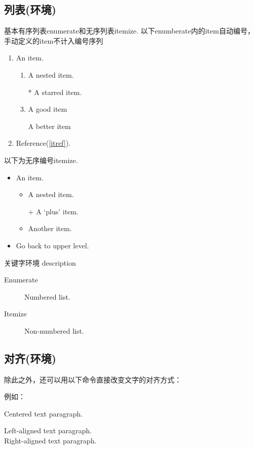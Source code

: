 \documentclass[10pt,a4paper,twocolumn]{book}
\begin{document}
\subsection{列表(环境)}
 基本有序列表enumerate和无序列表itemize.
以下enumberate内的item自动编号，手动定义的item不计入编号序列
 \begin{enumerate}
    \item An item.
    \begin{enumerate}
    \item A nested item.\label{itref} 
    \item[*] A starred item.
    \item A good item
    \item[] A better item
    \end{enumerate} 
    \item Reference(\ref{itref}). 
\end{enumerate}
以下为无序编号itemize.
\begin{itemize}
    \item An item. \begin{itemize}
    \item A nested item. 
    \item[+] A `plus' item. 
    \item Another item.
    \end{itemize} 
    \item Go back to upper level. 
\end{itemize}
关键字环境 description
\begin{description}
    \item[Enumerate] Numbered list. 
    \item[Itemize] Non-numbered list. 
\end{description}
\subsection{对齐(环境)}
除此之外，还可以用以下命令直接改变文字的对齐方式： 

例如：

\centering Centered text paragraph.\\
\raggedright Left-aligned text paragraph.\\
\raggedleft Right-aligned text paragraph.
\end{document}
